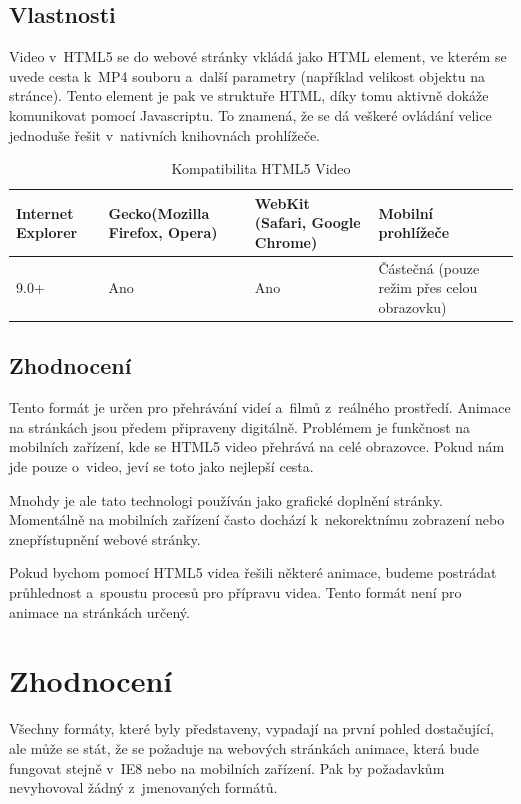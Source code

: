\subsection*{Vlastnosti}

Video v~HTML5 se do webové stránky vkládá jako  HTML\cite{html5video} element, ve kterém se uvede cesta k~MP4\cite{mp4} souboru a~další parametry (například velikost objektu na stránce). Tento element je pak ve struktuře HTML, díky tomu aktivně dokáže komunikovat pomocí Javascriptu\cite{javascript}. To znamená, že se dá veškeré ovládání velice jednoduše řešit v~nativních knihovnách prohlížeče. 


\begin{table}[h]\centering\footnotesize
	\caption[Kompatibilita HTML5]{Kompatibilita HTML5 Video}\label{tab:research-html5}
	\begin{tabular}{|m{2.5cm}|m{2.5cm}|m{2.5cm}|m{2.5cm}|}\hline
		Internet Explorer & Gecko(Mozilla Firefox, Opera)	& WebKit (Safari, Google Chrome) &  Mobilní prohlížeče
		\tabularnewline \hline
		9.0+  &  Ano & Ano & Částečná (pouze režim přes celou obrazovku)
		\tabularnewline \hline
	\end{tabular}
\end{table}

\subsection*{Zhodnocení}

Tento formát je určen pro přehrávání videí a~filmů z~reálného prostředí. Animace na stránkách jsou předem připraveny digitálně. Problémem je funkčnost na mobilních zařízení, kde se HTML5 video přehrává na celé obrazovce\cite{html5VideoSupport}. Pokud nám jde pouze o~video, jeví se toto jako nejlepší cesta. 

Mnohdy je ale tato technologi používán jako grafické doplnění stránky\cite{effectHtml5}. Momentálně na mobilních zařízení často dochází k~nekorektnímu zobrazení nebo znepřístupnění webové stránky.

Pokud bychom pomocí HTML5 videa řešili některé animace, budeme postrádat průhlednost a~spoustu procesů pro přípravu videa. Tento formát není pro animace na stránkách určený.

\section{Zhodnocení}

Všechny formáty, které byly představeny, vypadají na první pohled dostačující, ale může se stát, že se požaduje na webových stránkách animace, která bude fungovat stejně v~IE8 nebo na mobilních zařízení. Pak by požadavkům nevyhovoval žádný z~jmenovaných formátů. 

